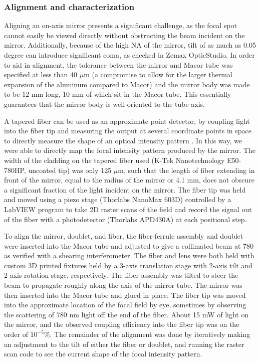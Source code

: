 \subsubsection{Alignment and characterization}

Aligning an on-axis mirror presents a significant challenge, as the focal spot cannot easily be viewed directly without obstructing the beam incident on the mirror. Additionally, because of the high NA of the mirror, tilt of as much as 0.05 degree can introduce significant coma, as checked in Zemax OpticStudio. In order to aid in alignment, the tolerance between the mirror and Macor tube was specified at less than 40 $\mu$m (a compromise to allow for the larger thermal expansion of the aluminum compared to Macor) and the mirror body was made to be 12 mm long, 10 mm of which sit in the Macor tube. This essentially guarantees that the mirror body is well-oriented to the tube axis. 

A tapered fiber can be used as an approximate point detector, by coupling light into the fiber tip and measuring the output at several coordinate points in space to directly measure the shape of an optical intensity pattern \cite{TOLEDOCROW1995,RHODES1998}. In this way, we were able to directly map the focal intensity pattern produced by the mirror. The width of the cladding on the tapered fiber used (K-Tek Nanotechnology E50-780HP, uncoated tip) was only 125 $\mu$m, such that the length of fiber extending in front of the mirror, equal to the radius of the mirror or 4.1 mm, does not obscure a significant fraction of the light incident on the mirror. The fiber tip was held and moved using a piezo stage (Thorlabs NanoMax 603D) controlled by a LabVIEW program to take 2D raster scans of the field and record the signal out of the fiber with a photodetector (Thorlabs APD430A) at each positional step. 

To align the mirror, doublet, and fiber, the fiber-ferrule assembly and doublet were inserted into the Macor tube and adjusted to give a collimated beam at 780 as verified with a shearing interferometer. The fiber and lens were both held with custom 3D printed fixtures held by a 3-axis translation stage with 2-axis tilt and 2-axis rotation stage, respectively. The fiber assembly was tilted to steer the beam to propagate roughly along the axis of the mirror tube. The mirror was then inserted into the Macor tube and glued in place. The fiber tip was moved into the approximate location of the focal field by eye, sometimes by observing the scattering of 780 nm light off the end of the fiber. About 15 mW of light on the mirror, and the observed coupling efficiency into the fiber tip was on the order of $10^{-5}\%$. The remainder of the alignment was done by iteratively making an adjustment to the tilt of either the fiber or doublet, and running the raster scan code to see the current shape of the focal intensity pattern.

